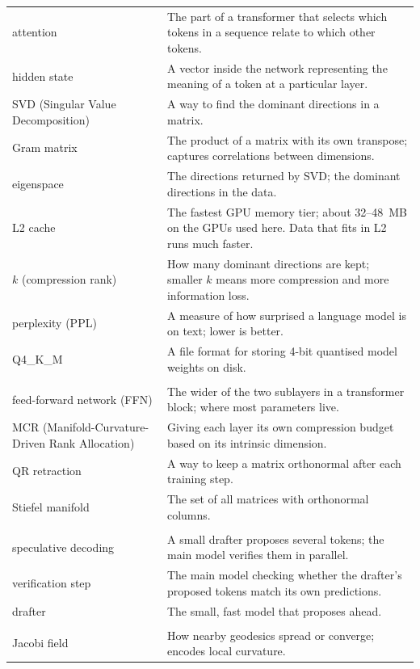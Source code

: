 \documentclass[11pt]{article}
\begin{document}
\begin{longtable}{@{}p{}p{}@{}}
\midrule
attention & The part of a transformer that selects which tokens in a sequence relate to which other tokens. \\
hidden state & A vector inside the network representing the meaning of a token at a particular layer. \\
SVD (Singular Value Decomposition) & A way to find the dominant directions in a matrix. \\
Gram matrix & The product of a matrix with its own transpose; captures correlations between dimensions. \\
eigenspace & The directions returned by SVD; the dominant directions in the data. \\
L2 cache & The fastest GPU memory tier; about 32--48~MB on the GPUs used here. Data that fits in L2 runs much faster. \\
$k$ (compression rank) & How many dominant directions are kept; smaller $k$ means more compression and more information loss. \\
perplexity (PPL) & A measure of how surprised a language model is on text; lower is better. \\
Q4\_K\_M & A file format for storing 4-bit quantised model weights on disk. \\
\addlinespace
\multicolumn{2}{@{}l}{Paper II (GP Pipeline)} \\
\midrule
feed-forward network (FFN) & The wider of the two sublayers in a transformer block; where most parameters live. \\
MCR (Manifold-Curvature-Driven Rank Allocation) & Giving each layer its own compression budget based on its intrinsic dimension. \\
QR retraction & A way to keep a matrix orthonormal after each training step. \\
Stiefel manifold & The set of all matrices with orthonormal columns. \\
\addlinespace
\multicolumn{2}{@{}l}{Paper III (Speculative Decoding)} \\
\midrule
speculative decoding & A small drafter proposes several tokens; the main model verifies them in parallel. \\
verification step & The main model checking whether the drafter's proposed tokens match its own predictions. \\
drafter & The small, fast model that proposes ahead. \\
\addlinespace
\multicolumn{2}{@{}l}{Paper IV (OTT / GTC)} \\
\midrule
Jacobi field & How nearby geodesics spread or converge; encodes local curvature. \\

\end{longtable}
\end{document}
